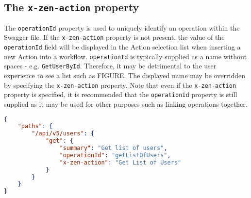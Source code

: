 \subsection{The \texttt{x-zen-action} property}
The \texttt{operationId} property is used to uniquely identify an operation within the Swagger file. If the \texttt{x-zen-action} property is not present, the value of the \texttt{operationId} field will be displayed in the Action selection list when inserting a new Action into a workflow. \texttt{operationId} is typically supplied as a name without spaces - e.g. \texttt{GetUserById}. Therefore, it may be detrimental to the user experience to see a list such as FIGURE. The displayed name may be overridden by specifying the \texttt{x-zen-action} property. Note that even if the \texttt{x-zen-action} property is specified, it is recommended that the \texttt{operationId} property is still supplied as it may be used for other purposes such as linking operations together.
\begin{lstlisting}[caption={\texttt{x-zen-action} usage},label={code:x-zen-action},language=json]
{
    "paths": {
        "/api/v5/users": {
            "get": {
                "summary": "Get list of users",
                "operationId": "getListOfUsers",
                "x-zen-action": "Get List of Users"
            }
        }
    }
}
\end{lstlisting}

